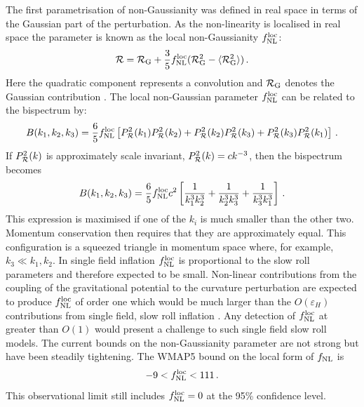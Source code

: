 The first parametrisation of non-Gaussianity was defined in
real space in terms of the Gaussian part of the perturbation. As the
non-linearity is localised in real space the parameter is
known as the local non-Gaussianity $f_{\mathrm{NL}}^\mathrm{loc}$: 
% 
\begin{equation} 
\label{eq:fnllocdefn-intro}
{\cal{R}} = {\cal{R}}_\mathrm{G} + \frac{3}{5} f_{\mathrm{NL}}^\mathrm{loc}  (
{\cal{R}}_\mathrm{G}^2 -\langle {\cal{R}}_\mathrm{G}^2 \rangle )\,.
\end{equation}
Here the 
quadratic component represents a convolution and 
$\mathcal{R}_\mathrm{G}$ denotes the Gaussian contribution
\cite{Maldacena:2002vr}\footnotemark.
The local non-Gaussian parameter $f_{\mathrm{NL}}^\mathrm{loc}$ can be related to the bispectrum by:
\begin{equation}
 B(k_1, k_2, k_3) = \frac{6}{5}f_{\mathrm{NL}}^\mathrm{loc} \left[P_{\mathcal{R}}^2(k_1)P_{\mathcal{R}}^2(k_2) +
P_{\mathcal{R}}^2(k_2)P_{\mathcal{R}}^2(k_3) + P_{\mathcal{R}}^2(k_3)P_{\mathcal{R}}^2(k_1)\right]\,.
\end{equation}
% 
If $P_{\mathcal{R}}^2(k)$ is approximately scale invariant, $P_{\mathcal{R}}^2(k) = c k^{-3}$, then
the bispectrum becomes \cite{Baumann2009}
% 
\begin{equation}
 B(k_1, k_2, k_3) = \frac{6}{5}f_{\mathrm{NL}}^\mathrm{loc} c^2\left[\frac{1}{k_1^3 k_2^3} +
\frac{1}{k_2^3 k_3^3} + \frac{1}{k_3^3 k_1^3}\right]\,.
\end{equation}
% 
This expression is maximised if one of the $k_i$ is much smaller than the other two.
Momentum
conservation then requires that they are approximately equal. This
configuration is a squeezed triangle in momentum space where, for example, $k_3 \ll
k_1,k_2$. In
single field inflation $f_{\mathrm{NL}}^\mathrm{loc}$ is proportional to the slow roll parameters
and therefore expected to be small. Non-linear contributions from the coupling
of the gravitational potential to the curvature perturbation are expected to
produce $f_{\mathrm{NL}}^\mathrm{loc}$ of order one which would be much larger than the
$O(\varepsilon_H)$ contributions from single field, slow roll inflation
\cite{Bartolo:2004if, Komatsu:2008hk}. Any detection of $f_{\mathrm{NL}}^\mathrm{loc}$ at greater
than $O(1)$ would present a challenge to such single field slow roll models. 
The current bounds on the non-Gaussianity parameter are not strong but have
been steadily tightening. The WMAP5 bound on the local form of $f_{\mathrm{NL}}$ is
% 
\begin{equation}
\label{eq:fnlloc-wmap5-intro}
 -9<f_{\mathrm{NL}}^\mathrm{loc}<111\,.
\end{equation}
% 
This observational limit still includes $f_{\mathrm{NL}}^\mathrm{loc}=0$ at the 95\% confidence level.


